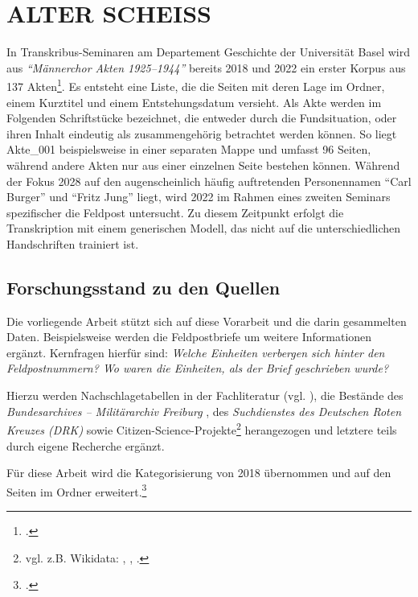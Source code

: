 \documentclass[12pt, a4paper, ngerman, bidi=default]{article}
\let\cite\footcite
\begin{document}
\section{ALTER SCHEISS}

In Transkribus-Seminaren am Departement Geschichte der Universität Basel wird aus \textit{\enquote{Männerchor Akten 1925--1944}} bereits 2018 und 2022 ein 
erster Korpus aus 137 Akten\cite[Weiterführend vgl.][]{burkhardt_arcgis_2022}. Es entsteht eine Liste, die die Seiten mit deren Lage im Ordner, einem Kurztitel und einem Entstehungsdatum versieht. Als Akte werden im Folgenden Schriftstücke bezeichnet, die entweder durch die Fundsituation, 
oder  ihren Inhalt eindeutig als zusammengehörig betrachtet werden können. So liegt Akte\_001 beispielsweise in einer separaten Mappe und umfasst 96 Seiten, 
während andere Akten nur aus einer einzelnen Seite bestehen können.  
Während der Fokus 2028 auf den augenscheinlich häufig auftretenden Personennamen \enquote{Carl Burger} und \enquote{Fritz Jung} liegt, wird 2022 im Rahmen eines zweiten Seminars spezifischer die Feldpost untersucht.
Zu diesem Zeitpunkt erfolgt die Transkription mit einem generischen Modell, das nicht auf die unterschiedlichen Handschriften trainiert 
ist.
\subsection{Forschungsstand zu den Quellen}
Die vorliegende Arbeit stützt sich auf diese Vorarbeit und die darin gesammelten Daten. Beispielsweise werden die Feldpostbriefe um weitere Informationen ergänzt. Kernfragen hierfür sind: \textit{Welche Einheiten verbergen sich hinter den Feldpostnummern? Wo waren die Einheiten, als der Brief geschrieben wurde?}

Hierzu werden Nachschlagetabellen in der Fachliteratur (vgl. \autocites{tessin_verbande_1977}{hartmann_wehrmacht_2010}{rass_deutsche_2009}), die Bestände des \textit{Bundesarchives – Militärarchiv Freiburg} \autocite{hollmann_freiburg_2025}, des \textit{Suchdienstes des Deutschen Roten Kreuzes (DRK)} \autocite{reuter_drk_2025} sowie Citizen-Science-Projekte\footnote{ vgl. z.B. Wikidata: \autocite{burkhardt_78th_2024}, \autocite{altenburger_lexikon_nodate-1}, \autocite{hermans_forum_nodate}.} herangezogen und letztere teils durch eigene Recherche ergänzt.


Für diese Arbeit wird die Kategorisierung von 2018 übernommen und auf den Seiten im Ordner erweitert.\cite[vgl.][]{burkhardt_githubakten_gesamtubersichtcsv_2025} 
\end{document}
